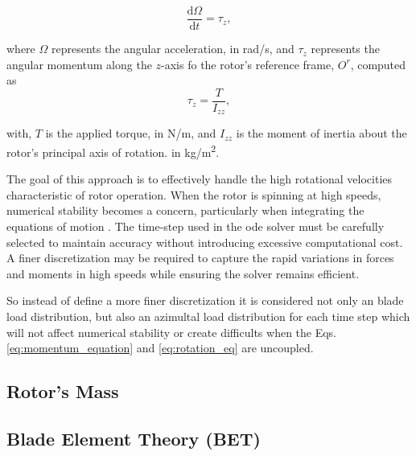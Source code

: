 \begin{equation}
    \frac{\mathrm{d}\Omega}{\mathrm{d}t} = \tau_z
    \label{eq:rotation_eq},
\end{equation}

\noindent where $\Omega$ represents the angular acceleration, in \unit{rad/s}, and $\tau_z$ represents the angular momentum along the $z$-axis fo the rotor's reference frame, $O^r$, computed as 
\begin{equation}
    \tau_z = \frac{T}{I_{zz}},
\end{equation}

\noindent with, $T$ is the applied torque, in \unit{N/m}, and $I_{zz}$ is the moment of inertia about the rotor’s principal axis of rotation. in \unit{kg/m^2}.

The goal of this approach is to effectively handle the high rotational velocities characteristic of rotor operation. When the rotor is spinning at high speeds, numerical stability becomes a concern, particularly when integrating the equations of motion \cite{arnold_numerical_2011,press_numerical_2007}. The time-step used in the \gls{ode} solver must be carefully selected to maintain accuracy without introducing excessive computational cost. A finer discretization may be required to capture the rapid variations in forces and moments in high speeds while ensuring the solver remains efficient.

So instead of define a more finer discretization it is considered not only an blade load distribution, but also an azimultal load distribution for each time step which will not affect numerical stability or create difficults when the Eqs. \ref{eq:momentum_equation} and \ref{eq:rotation_eq} are uncoupled.

\subsection{Rotor's Mass}
\label{sec:rotors_mass}

\subsection{Blade Element Theory (BET)}
\label{section:bet}

